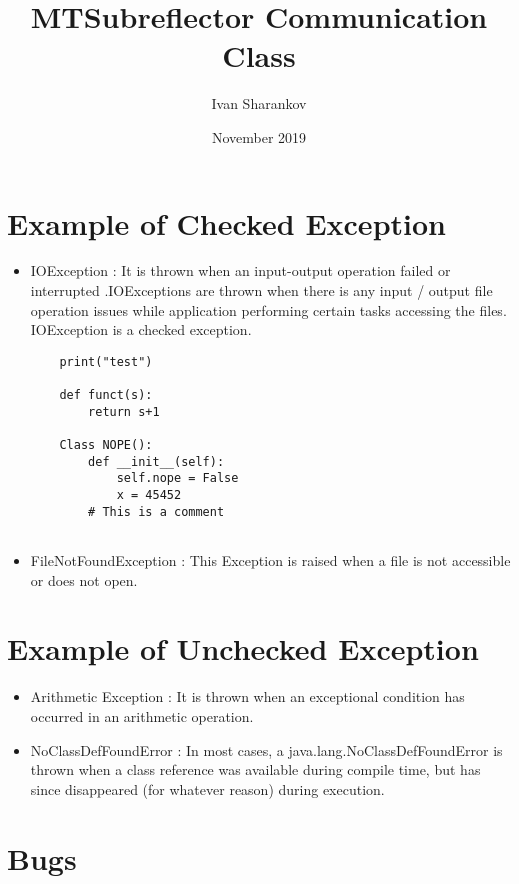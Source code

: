 \documentclass{article}
\title{MTSubreflector Communication Class}
\author{Ivan Sharankov }
\date{November 2019}
\begin{document}
\maketitle

\section{Example of Checked Exception}
\begin{itemize}
    \item IOException : It is thrown when an input-output operation failed or interrupted .IOExceptions are thrown when there is any input / output file operation issues while application performing certain tasks accessing the files. IOException is a checked exception.
    
    \begin{itemize}
    \begin{lstlisting}
    print("test")
    
    def funct(s):
        return s+1
        
    Class NOPE():
        def __init__(self):
            self.nope = False
            x = 45452
        # This is a comment 
   
    \end{lstlisting}
    \end{itemize}
    \item FileNotFoundException : This Exception is raised when a file is not accessible or does not open.

\end{itemize}


\section{Example of Unchecked Exception}
\begin{itemize}

\item Arithmetic Exception : It is thrown when an exceptional condition has occurred in an arithmetic operation.
 

\item NoClassDefFoundError : In most cases, a java.lang.NoClassDefFoundError is thrown when a class reference was available during compile time, but has since disappeared (for whatever reason) during execution.

\end{itemize}


\section{Bugs}
\end{document}
